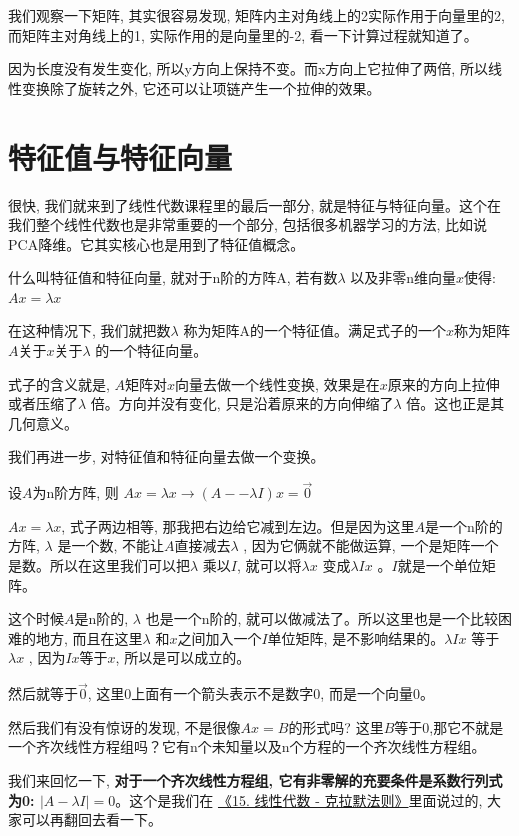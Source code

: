 我们观察一下矩阵, 其实很容易发现, 矩阵内主对角线上的2实际作用于向量里的2,  而矩阵主对角线上的1, 实际作用的是向量里的-2, 看一下计算过程就知道了。

因为长度没有发生变化, 所以y方向上保持不变。而x方向上它拉伸了两倍, 所以线性变换除了旋转之外, 它还可以让项链产生一个拉伸的效果。

\section{特征值与特征向量}

很快, 我们就来到了线性代数课程里的最后一部分, 就是特征与特征向量。这个在我们整个线性代数也是非常重要的一个部分, 包括很多机器学习的方法, 比如说PCA降维。它其实核心也是用到了特征值概念。

什么叫特征值和特征向量, 就对于n阶的方阵A, 若有数$\lambda$ 以及非零n维向量$x$使得: $Ax = \lambda x$

在这种情况下, 我们就把数$\lambda$ 称为矩阵A的一个特征值。满足式子的一个$x$称为矩阵$A$关于$x$关于$\lambda$ 的一个特征向量。

式子的含义就是, $A$矩阵对$x$向量去做一个线性变换, 效果是在$x$原来的方向上拉伸或者压缩了$\lambda$ 倍。方向并没有变化, 只是沿着原来的方向伸缩了$\lambda$ 倍。这也正是其几何意义。

我们再进一步, 对特征值和特征向量去做一个变换。

设$A$为n阶方阵, 则 $Ax = \lambda x \to (A - \mbox{−} \lambda I)x = \vec 0$

$Ax = \lambda x$, 式子两边相等, 那我把右边给它减到左边。但是因为这里$A$是一个n阶的方阵, $\lambda$ 是一个数, 不能让$A$直接减去$\lambda$ , 因为它俩就不能做运算, 一个是矩阵一个是数。所以在这里我们可以把$\lambda$ 乘以$I$, 就可以将$\lambda x$ 变成$\lambda Ix$ 。$I$就是一个单位矩阵。

这个时候$A$是n阶的, $\lambda$ 也是一个n阶的, 就可以做减法了。所以这里也是一个比较困难的地方, 而且在这里$\lambda$ 和$x$之间加入一个$I$单位矩阵, 是不影响结果的。$\lambda Ix$ 等于$\lambda x$ , 因为$Ix$等于$x$, 所以是可以成立的。

然后就等于$\vec 0$,  这里0上面有一个箭头表示不是数字0, 而是一个向量0。

然后我们有没有惊讶的发现, 不是很像$Ax = B$的形式吗? 这里$B$等于0,那它不就是一个齐次线性方程组吗？它有n个未知量以及n个方程的一个齐次线性方程组。

我们来回忆一下, \textbf{对于一个齐次线性方程组,  它有非零解的充要条件是系数行列式为0: $|A - \lambda I| = 0$}。这个是我们在 \hyperlink{15.线性代数}{《15. 线性代数 - 克拉默法则》}里面说过的, 大家可以再翻回去看一下。

